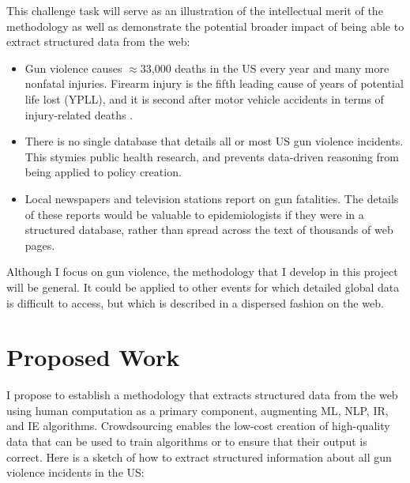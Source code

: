 \documentclass[11pt]{article}
\begin{document}
This challenge task will serve as an illustration of the intellectual merit of the methodology as well as demonstrate the potential broader impact of being able to extract structured data from the web:
\begin{itemize}
\item Gun violence causes $\approx$33,000 deaths in the US every year and many more nonfatal injuries. Firearm injury is the fifth leading cause of years of potential life lost (YPLL), and it is second after motor vehicle accidents in terms of injury-related deaths  \cite{ficapresourcebook}. 
\item There is no single database that details all or most US gun violence incidents.  This stymies public health research, and prevents data-driven reasoning from being applied to policy creation. 
\item Local newspapers and television stations report on gun fatalities. The details of these reports would be valuable to epidemiologists if they were in a structured database, rather than spread across the text of thousands of web pages.
\end{itemize}
Although I focus on gun violence, the methodology that I develop in this project will be general.  It could be applied to other events for which detailed global data is difficult to access, but which is described in a dispersed fashion on the web.  



\section{Proposed Work}

I propose to establish a methodology that extracts structured data from the web using human computation as a primary component, augmenting ML, NLP, IR, and IE algorithms.  Crowdsourcing enables the low-cost creation of high-quality data that can be used to train algorithms or to ensure that their output is correct.   Here is a sketch of how to extract structured information about all gun violence incidents in the US:
\end{document}
